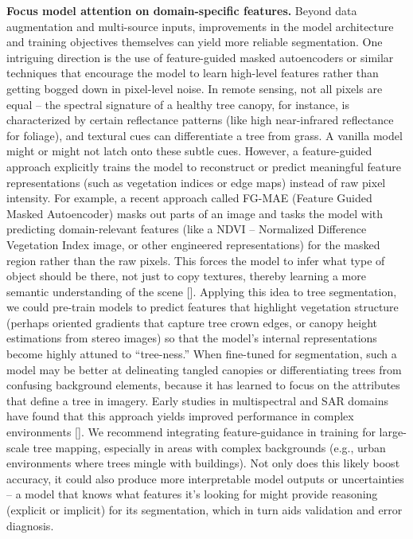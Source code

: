 \documentclass[runningheads]{llncs}
\begin{document}
\textbf{Focus model attention on domain-specific features.} Beyond data
augmentation and multi-source inputs, improvements in the model
architecture and training objectives themselves can yield more reliable
segmentation. One intriguing direction is the use of feature-guided
masked autoencoders or similar techniques that encourage the model to
learn high-level features rather than getting bogged down in pixel-level
noise. In remote sensing, not all pixels are equal -- the spectral
signature of a healthy tree canopy, for instance, is characterized by
certain reflectance patterns (like high near-infrared reflectance for
foliage), and textural cues can differentiate a tree from grass. A
vanilla model might or might not latch onto these subtle cues. However,
a feature-guided approach explicitly trains the model to reconstruct or
predict meaningful feature representations (such as vegetation indices
or edge maps) instead of raw pixel intensity. For example, a recent
approach called FG-MAE (Feature Guided Masked Autoencoder) masks out
parts of an image and tasks the model with predicting domain-relevant
features (like a NDVI -- Normalized Difference Vegetation Index image,
or other engineered representations) for the masked region rather than
the raw pixels. This forces the model to infer what type of object
should be there, not just to copy textures, thereby learning a more
semantic understanding of the scene {[}\cite{mukkavilli2023prithvi}{]}.
Applying this idea to tree segmentation, we could pre-train models to
predict features that highlight vegetation structure (perhaps oriented
gradients that capture tree crown edges, or canopy height estimations
from stereo images) so that the model's internal representations become
highly attuned to ``tree-ness.'' When fine-tuned for segmentation, such
a model may be better at delineating tangled canopies or differentiating
trees from confusing background elements, because it has learned to
focus on the attributes that define a tree in imagery. Early studies in
multispectral and SAR domains have found that this approach yields
improved performance in complex environments
{[}\cite{mukkavilli2023prithvi}{]}. We recommend integrating
feature-guidance in training for large-scale tree mapping, especially in
areas with complex backgrounds (e.g., urban environments where trees
mingle with buildings). Not only does this likely boost accuracy, it
could also produce more interpretable model outputs or uncertainties --
a model that knows what features it's looking for might provide
reasoning (explicit or implicit) for its segmentation, which in turn
aids validation and error diagnosis.
\end{document}
